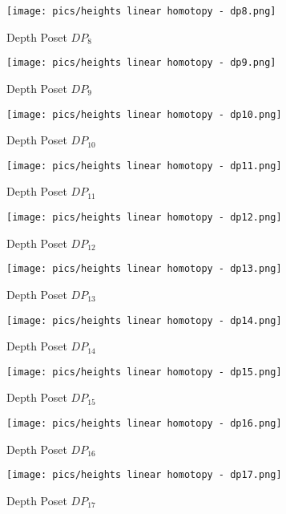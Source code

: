 \documentclass{article}
\begin{document}
\begin{figure}[h]
    \centering
    \texttt{[image: pics/heights linear homotopy - dp8.png]}
    \caption{Depth Poset $DP_{8}$}
    \label{fig:dp8}
\end{figure}
\begin{figure}[h]
    \centering
    \texttt{[image: pics/heights linear homotopy - dp9.png]}
    \caption{Depth Poset $DP_{9}$}
    \label{fig:dp9}
\end{figure}
\begin{figure}[h]
    \centering
    \texttt{[image: pics/heights linear homotopy - dp10.png]}
    \caption{Depth Poset $DP_{10}$}
    \label{fig:dp10}
\end{figure}
\begin{figure}[h]
    \centering
    \texttt{[image: pics/heights linear homotopy - dp11.png]}
    \caption{Depth Poset $DP_{11}$}
    \label{fig:dp11}
\end{figure}
\begin{figure}[h]
    \centering
    \texttt{[image: pics/heights linear homotopy - dp12.png]}
    \caption{Depth Poset $DP_{12}$}
    \label{fig:dp12}
\end{figure}
\begin{figure}[h]
    \centering
    \texttt{[image: pics/heights linear homotopy - dp13.png]}
    \caption{Depth Poset $DP_{13}$}
    \label{fig:dp13}
\end{figure}
\begin{figure}[h]
    \centering
    \texttt{[image: pics/heights linear homotopy - dp14.png]}
    \caption{Depth Poset $DP_{14}$}
    \label{fig:dp14}
\end{figure}
\begin{figure}[h]
    \centering
    \texttt{[image: pics/heights linear homotopy - dp15.png]}
    \caption{Depth Poset $DP_{15}$}
    \label{fig:dp15}
\end{figure}
\begin{figure}[h]
    \centering
    \texttt{[image: pics/heights linear homotopy - dp16.png]}
    \caption{Depth Poset $DP_{16}$}
    \label{fig:dp16}
\end{figure}
\begin{figure}[h]
    \centering
    \texttt{[image: pics/heights linear homotopy - dp17.png]}
    \caption{Depth Poset $DP_{17}$}
    \label{fig:dp17}
\end{figure}
\end{document}
